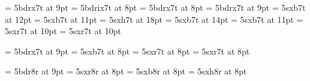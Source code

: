 \usepackage{struktur,bodoni}
\font\ixpt      = 5bdrx7t at 9pt
\font\confname  = 5bdrix7t at 8pt
\font\crnotice  = 5bdrx7t at 8pt
\font\ninept    = 5bdrx7t at 9pt
\font\secfnt    = 5sxb7t at 12pt
\font\subsecfnt = 5sxb7t at 11pt
\font\ttlfnt    = 5sxh7t at 18pt
\font\subttlfnt = 5sxb7t at 14pt
\font\aufnt     = 5sxb7t at 11pt
\font\affaddr   = 5sxr7t at 10pt
\font\eaddfnt   = 5sxr7t at 10pt

\font\CMfont = 5bdrx7t at 9pt  %
\font\KWfont = 5sxb7t at 8pt   %
\font\VRfont = 5sxr7t at 8pt   %
\font\BGfont = 5sxr7t at 8pt   %

\font\rawcm  = 5bdr8r at 9pt  %
\font\rawrm  = 5sxr8r at 8pt  %
\font\rawbf  = 5sxb8r at 8pt
\font\rawhv  = 5sxh8r at 8pt

\def\labelitemi{\textbullet}
\def\la{{\rawrm\char'074}}
\def\ra{{\rawrm\char'076}}
\def\codeleq{{\rawrm\char'235}}
\def\codeminus{{\rawrm\char'226}}
\def\codelb{{\rawrm\char'173}}
\def\coderb{{\rawrm\char'175}}
\def\textlt{{\rawcm\char'074}}
\def\textgt{{\rawcm\char'076}}
\def\cd#1{{\BGfont#1}}
\def\id#1{\texttt{#1}}
\def\to{\ensuremath\rightarrow}


\def\Mop#1{{\color{blue}{#1}}}
\def\Mbegincode{\Mop{\rawhv.\la}\thinspace}
\def\Mendcode{\thinspace\Mop{\ra\rawhv.}}
\def\Msplice{\Mop{\rawhv.\char'176}}
\def\Mtilde{\char'176}
\def\Mbang{{\rawhv!}}
\def\Mrun{\Mop{\rawhv.!}}

\def\Msp#1{{\color{green}{#1}}}
\def\Mquote#1{\Msp{\rawhv\char'074{\rawbf?}#1}\thinspace}
\def\Munquote{\thinspace\Msp{{\rawbf?}{\rawhv\char'076}}}

